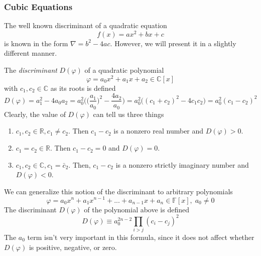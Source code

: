 \documentclass{article}
\begin{document}
    \subsubsection{Cubic Equations}

      The well known discriminant of a quadratic equation 
      \begin{equation}
        f(x) = ax^2 + bx + c
      \end{equation}
      is known in the form $\nabla = b^2 - 4ac$. However, we will present it in a slightly different manner. 

      \begin{definition}
        The \textit{discriminant} $D(\varphi)$ of a quadratic polynomial
        \begin{equation}
          \varphi = a_0 x^2 + a_1 x + a_2 \in \mathbb{C}[x]
        \end{equation}
        with $c_1, c_2 \in \mathbb{C}$ as its roots is defined
        \begin{equation}
          D(\varphi) = a_1^2 - 4 a_0 a_2 = a_0^2 \bigg( \Big(\frac{a_1}{a_0} \Big)^2 - \frac{4 a_2}{a_0} \bigg) = a_0^2 \big( (c_1 + c_2)^2 - 4 c_1 c_2 \big) = a_0^2 (c_1 - c_2)^2
        \end{equation}
        Clearly, the value of $D(\varphi)$ can tell us three things
        \begin{enumerate}
          \item $c_1, c_2 \in \mathbb{R}, c_1 \neq c_2$. Then $c_1 - c_2$ is a nonzero real number and $D(\varphi) > 0$. 
          \item $c_1 = c_2 \in \mathbb{R}$. Then $c_1 - c_2 = 0$ and $D(\varphi) = 0$. 
          \item $c_1, c_2 \in \mathbb{C}, c_1 = \bar{c}_2$. Then, $c_1 - c_2$ is a nonzero strictly imaginary number and $D(\varphi) < 0$. 
        \end{enumerate}
      \end{definition}

      \begin{definition}
        We can generalize this notion of the discriminant to arbitrary polynomials
        \begin{equation}
          \varphi = a_0 x^n + a_1 x^{n-1} + ... + a_{n-1} x + a_n \in \mathbb{F}[x], \; a_0 \neq 0
        \end{equation}
        The discriminant $D(\varphi)$ of the polynomial above is defined
        \begin{equation}
          D(\varphi) \equiv a_0^{2n-2} \prod_{i>j} (c_i - c_j)^2
        \end{equation}
        The $a_0$ term isn't very important in this formula, since it does not affect whether $D(\varphi)$ is positive, negative, or zero. 
      \end{definition}
\end{document}
